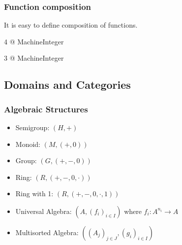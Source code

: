 \begin{frame}[fragile]
  \frametitle<presentation>{Function composition}
  It is easy to define composition of functions.
\begin{myverbatim}




4 @ MachineInteger

3 @ MachineInteger
\end{myverbatim}
\end{frame}
\begin{myverbatim}
\end{myverbatim}
\begin{comment}
<<Functions3>>=
aldor -gloop
macro I == MachineInteger;
import from I;
double(i: I): I == i+i;
succ(i: I): I == i+1;
(f: I->I) * (g: I->I): I->I == (i: I): I +-> f g i;
foo := double * succ;
bar := succ * double;
foo 1
bar 1
#quit
@
\end{comment}















\subsection{Domains and Categories}


\begin{frame}
  \frametitle{Algebraic Structures}

  \begin{itemize}
  \item Semigroup: $(H, +)$
  \item Monoid: $(M, (+, 0))$
  \item Group: $(G, (+, -, 0))$
  \item Ring: $(R, (+, -, 0, \cdot))$
  \item Ring with 1: $(R, (+, -, 0, \cdot, 1))$
  \end{itemize}

  \begin{itemize}
  \item Universal Algebra: $(A, (f_i)_{i\in I})$ where $f_i: A^{n_i}\to A$
  \item Multisorted Algebra: $((A_j)_{j\in J}, (g_i)_{i\in I})$
  \end{itemize}
\end{frame}






